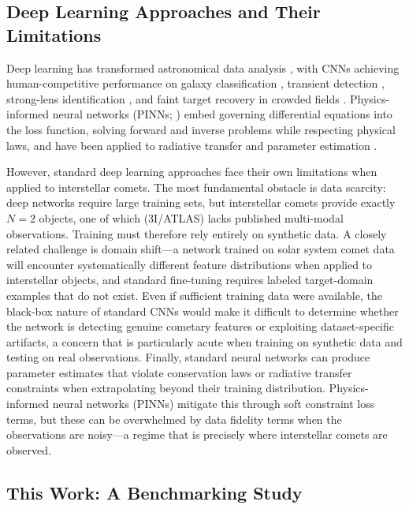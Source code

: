 \documentclass[usenatbib]{mnras}
\begin{document}
\subsection{Deep Learning Approaches and Their Limitations}

Deep learning has transformed astronomical data analysis \citep{baron19}, with CNNs achieving human-competitive performance on galaxy classification \citep{dieleman15}, transient detection \citep{goldstein15}, strong-lens identification \citep{lanusse18}, and faint target recovery in crowded fields \citep{jiang23}. Physics-informed neural networks (PINNs; \citealt{raissi19}) embed governing differential equations into the loss function, solving forward and inverse problems while respecting physical laws, and have been applied to radiative transfer \citep{mishra21,biswal25} and parameter estimation \citep{lu21}.

However, standard deep learning approaches face their own limitations when applied to interstellar comets. The most fundamental obstacle is data scarcity: deep networks require large training sets, but interstellar comets provide exactly $N=2$ objects, one of which (3I/ATLAS) lacks published multi-modal observations. Training must therefore rely entirely on synthetic data. A closely related challenge is domain shift---a network trained on solar system comet data will encounter systematically different feature distributions when applied to interstellar objects, and standard fine-tuning requires labeled target-domain examples that do not exist. Even if sufficient training data were available, the black-box nature of standard CNNs would make it difficult to determine whether the network is detecting genuine cometary features or exploiting dataset-specific artifacts, a concern that is particularly acute when training on synthetic data and testing on real observations. Finally, standard neural networks can produce parameter estimates that violate conservation laws or radiative transfer constraints when extrapolating beyond their training distribution. Physics-informed neural networks (PINNs) mitigate this through soft constraint loss terms, but these can be overwhelmed by data fidelity terms when the observations are noisy---a regime that is precisely where interstellar comets are observed.

\subsection{This Work: A Benchmarking Study}
\end{document}
